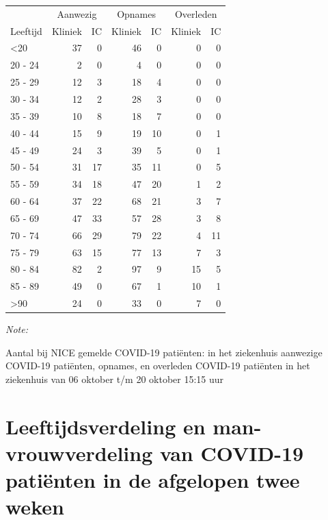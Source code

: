 \documentclass[
  english,
  man,floatsintext]{apa6}
\begin{document}
\begin{table}
\centering\begingroup\fontsize{10}{12}\selectfont

\begin{threeparttable}
\begin{tabular}{lrrrrrr}
\toprule
\multicolumn{1}{c}{ } & \multicolumn{2}{c}{Aanwezig} & \multicolumn{2}{c}{Opnames} & \multicolumn{2}{c}{Overleden} \\
\cmidrule(l{3pt}r{3pt}){2-3} \cmidrule(l{3pt}r{3pt}){4-5} \cmidrule(l{3pt}r{3pt}){6-7}
Leeftijd & Kliniek & IC & Kliniek & IC & Kliniek & IC\\
\midrule
<20 & 37 & 0 & 46 & 0 & 0 & 0\\
20 - 24 & 2 & 0 & 4 & 0 & 0 & 0\\
25 - 29 & 12 & 3 & 18 & 4 & 0 & 0\\
30 - 34 & 12 & 2 & 28 & 3 & 0 & 0\\
35 - 39 & 10 & 8 & 18 & 7 & 0 & 0\\
40 - 44 & 15 & 9 & 19 & 10 & 0 & 1\\
45 - 49 & 24 & 3 & 39 & 5 & 0 & 1\\
50 - 54 & 31 & 17 & 35 & 11 & 0 & 5\\
55 - 59 & 34 & 18 & 47 & 20 & 1 & 2\\
60 - 64 & 37 & 22 & 68 & 21 & 3 & 7\\
65 - 69 & 47 & 33 & 57 & 28 & 3 & 8\\
70 - 74 & 66 & 29 & 79 & 22 & 4 & 11\\
75 - 79 & 63 & 15 & 77 & 13 & 7 & 3\\
80 - 84 & 82 & 2 & 97 & 9 & 15 & 5\\
85 - 89 & 49 & 0 & 67 & 1 & 10 & 1\\
>90 & 24 & 0 & 33 & 0 & 7 & 0\\
\bottomrule
\end{tabular}
\begin{tablenotes}
\item \textit{Note: } 
\item Aantal bij NICE gemelde COVID-19 patiënten: in het ziekenhuis aanwezige COVID-19 patiënten, opnames, en overleden COVID-19 patiënten in het ziekenhuis van 06 oktober t/m 20 oktober 15:15 uur
\end{tablenotes}
\end{threeparttable}
\endgroup{}
\end{table}

\newpage

\hypertarget{leeftijdsverdeling-en-man-vrouwverdeling-van-covid-19-patiuxebnten-in-de-afgelopen-twee-weken}{%
\section{Leeftijdsverdeling en man-vrouwverdeling van COVID-19 patiënten in de afgelopen twee weken}\label{leeftijdsverdeling-en-man-vrouwverdeling-van-covid-19-patiuxebnten-in-de-afgelopen-twee-weken}}
\end{document}
